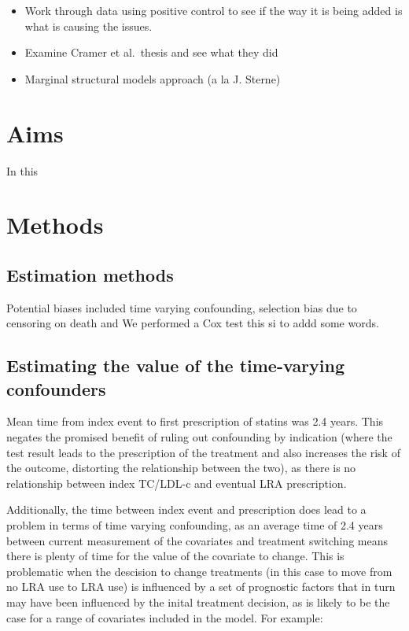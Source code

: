 \documentclass[a4paper, twoside]{templates/ociamthesis}
\providecommand{\tightlist}{%
  \setlength{\itemsep}{0pt}\setlength{\parskip}{0pt}}
\begin{document}
\begin{itemize}
\tightlist
\item
  Work through data using positive control to see if the way it is being added is what is causing the issues.
\item
  Examine Cramer et al.~thesis and see what they did
\item
  Marginal structural models approach (a la J. Sterne)
\end{itemize}

\hypertarget{aims-1}{%
\section{Aims}\label{aims-1}}

In this

\hypertarget{methods-1}{%
\section{Methods}\label{methods-1}}

\hypertarget{estimation-methods}{%
\subsection{Estimation methods}\label{estimation-methods}}

Potential biases included time varying confounding, selection bias due to censoring on death and
We performed a Cox test this si to addd some words.

\hypertarget{estimating-the-value-of-the-time-varying-confounders}{%
\subsection{Estimating the value of the time-varying confounders}\label{estimating-the-value-of-the-time-varying-confounders}}

Mean time from index event to first prescription of statins was 2.4 years. This negates the promised benefit of ruling out confounding by indication (where the test result leads to the prescription of the treatment and also increases the risk of the outcome, distorting the relationship between the two), as there is no relationship between index TC/LDL-c and eventual LRA prescription.

Additionally, the time between index event and prescription does lead to a problem in terms of time varying confounding, as an average time of 2.4 years between current measurement of the covariates and treatment switching means there is plenty of time for the value of the covariate to change. This is problematic when the descision to change treatments (in this case to move from no LRA use to LRA use) is influenced by a set of prognostic factors that in turn may have been influenced by the inital treatment decision, as is likely to be the case for a range of covariates included in the model. For example:
\end{document}
